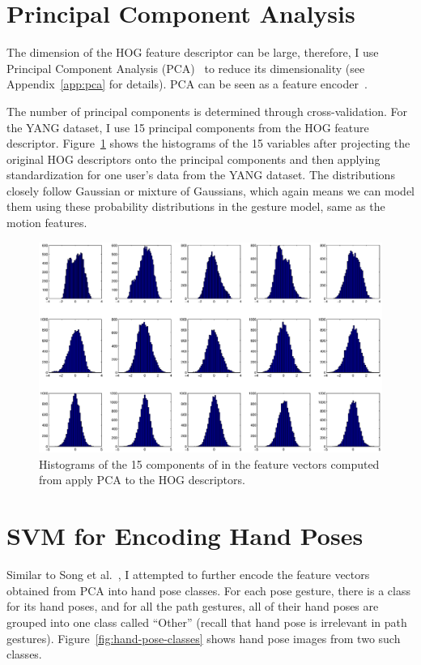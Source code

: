 \section{Principal Component Analysis}
The dimension of the HOG feature descriptor can be large, therefore, I use
Principal Component Analysis (PCA)~\cite{pca} to reduce its dimensionality (see
Appendix~\ref{app:pca} for details). PCA can be seen as a feature
encoder~\cite{ranzato07}.

The number of principal components is determined through cross-validation. For
the YANG dataset, I use 15 principal components from the HOG feature descriptor.
Figure~\ref{fig:pca} shows the histograms of the 15
variables after projecting the original HOG descriptors onto the principal
components and then applying standardization for one user's data from the YANG
dataset. The distributions closely follow Gaussian or mixture of
Gaussians, which again means
we can model them using these probability distributions in the gesture
model, same as the motion features.

\begin{figure}[tbh]
\includegraphics[width=\columnwidth]{figures/hist_pca.eps}
\caption{Histograms of the 15 components of in the feature vectors computed
from apply PCA to the HOG descriptors.}
\label{fig:pca}
\end{figure}

\section{SVM for Encoding Hand Poses}
Similar to Song et al.~\cite{song12}, I attempted to further encode the feature
vectors obtained from PCA into hand pose classes. For each pose
gesture, there is a class for its hand poses, and for all the path
gestures, all of their hand poses are grouped into one class called ``Other''
(recall that hand pose is irrelevant in path gestures).
Figure~\ref{fig:hand-pose-classes} shows hand pose images from two such classes.

